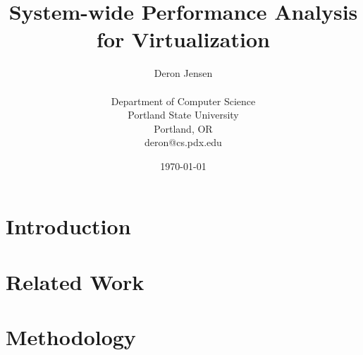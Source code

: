 \documentclass[12pt,onecolumn,oneside]{article}
\begin{document}
\title{System-wide Performance Analysis for Virtualization}
\author{Deron Jensen\\
\\
Department of Computer Science\\
Portland State University\\
Portland, OR \\
deron@cs.pdx.edu \\
}
\date{\today}
  \maketitle
\newpage

\begin{abstract}

\end{abstract}

\newpage

\setcounter{page}{1}

\tableofcontents    %
\newpage
\listoftables
\newpage
\listoffigures 
\newpage


\newpage

\onecolumn

\setcounter{page}{1}
\section{Introduction}

\newpage

% 


\section{Related Work}


\newpage

\section{Methodology}

\end{document}

